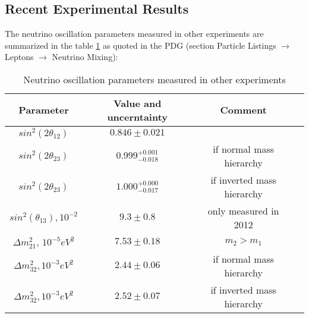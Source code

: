 \subsection{Recent Experimental Results}
The neutrino oscillation parameters measured in other experiments are summarized in the table \ref{tab:MeasuredPars} as quoted in the PDG \cite{ref_PDG} (section Particle Listings $\rightarrow$ Leptons $\rightarrow$ Neutrino Mixing):\\
\begin{table}[h]
  \begin{center}
  \caption{ Neutrino oscillation parameters measured in other experiments}
  \begin{tabular}{|c|c|c|c|}
     Parameter & Value and uncerntainty & Comment \\ \hline
     $sin^2(2\theta_{12})$ &  $0.846\pm0.021$ & \\ \hline 
     $sin^2(2\theta_{23})$ &  $0.999^{+0.001}_{-0.018}$ & if normal mass hierarchy \\ \hline 
     $sin^2(2\theta_{23})$ &  $1.000^{+0.000}_{-0.017}$  & if inverted mass hierarchy \\ \hline 
     $sin^2(\theta_{13}), 10^{-2}$ &  $9.3\pm0.8$  & only measured in 2012\\ \hline 
     ${\Delta}m^2_{21}$, $10^{-5} eV^2$ &  $7.53\pm0.18$  &  $m_{2}>m_{1}$   \\ \hline 
     ${\Delta}m^2_{32}, 10^{-3} eV^2$ &  $2.44\pm0.06$  &  if normal mass hierarchy     \\ \hline
     ${\Delta}m^2_{32}, 10^{-3} eV^2$ &  $2.52\pm0.07$  &  if inverted mass hierarchy     \\ \hline 
  \end{tabular}
  \label{tab:MeasuredPars}
  \end{center}
\end{table}


